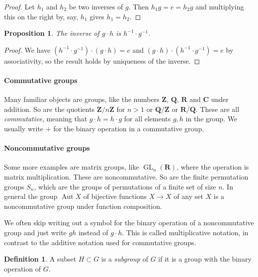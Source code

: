 \documentclass[11pt]{article}
\newtheorem{prop}[theo]{Proposition}
\theoremstyle{definition}
\newtheorem{defi}[theo]{Definition}
\def\CC{\mathbf{C}}
\def\RR{\mathbf{R}}
\def\QQ{\mathbf{Q}}
\def\ZZ{\mathbf{Z}}
\DeclareMathOperator{\GL}{GL}
\begin{document}
\begin{proof}
Let $h_1$ and $h_2$ be two inverses of $g$.
Then
$h_1 g = e = h_2 g$
and multiplying this on the right by, say, $h_1$ gives $h_1 = h_2$.
\end{proof}

\begin{prop}
The inverse of $g \cdot h$ is $h^{-1} \cdot g^{-1}$.
\end{prop}

\begin{proof}
We have $(h^{-1} \cdot g^{-1}) \cdot (g \cdot h) = e$ and
$(g \cdot h) \cdot (h^{-1} \cdot g^{-1}) = e$ by associativity,
so the result holds by uniqueness of the inverse.
\end{proof}



\paragraph{Commutative groups}

Many familiar objects are groups, like the numbers $\ZZ$, $\QQ$, $\RR$ and
$\CC$ under addition.
So are the quotients $\ZZ / n \ZZ$ for $n > 1$ or $\QQ / \ZZ$ or $\RR / \QQ$.
These are all \emph{commutative}, meaning that $g \cdot h = h \cdot g$ for all
elements $g,h$ in the group.
We usually write $+$ for the binary operation in a commutative group.

\paragraph{Noncommutative groups}

Some more examples are matrix groups, like $\GL_n(\RR)$, where
the operation is matrix multiplication.
These are noncommutative.
So are the finite permutation groups $S_n$, which are the groups of
permutations of a finite set of size $n$.
In general the group $\operatorname{Aut} X$ of bijective functions $X \to X$ of
any set $X$ is a noncommutative group under function composition.

We often skip writing out a symbol for the binary operation of a noncommutative
group and just write $gh$ instead of $g \cdot h$.
This is called multiplicative notation, in contrast to the additive notation
used for commutative groups.


\begin{defi}
A subset $H \subset G$ is a \emph{subgroup} of $G$ if it is a group with the
binary operation of $G$.
\end{defi}
\end{document}
